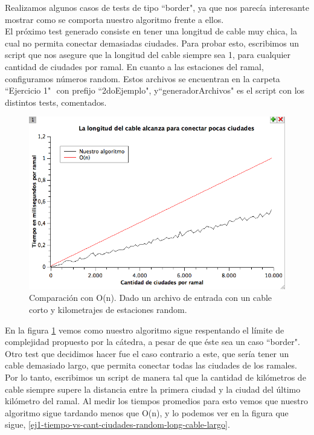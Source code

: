 Realizamos algunos casos de tests de tipo ``border", ya que nos parecía interesante mostrar como se comporta nuestro algoritmo frente a ellos.\\

El próximo test generado consiste en tener una longitud de cable muy chica, la cual no permita conectar demasiadas ciudades. Para probar esto, escribimos un script que nos asegure que la longitud del cable siempre sea 1, para cualquier cantidad de ciudades por ramal. En cuanto a las estaciones del ramal, configuramos números random. Estos archivos se encuentran en la carpeta ``Ejercicio 1" $ $ con prefijo ``2doEjemplo", y``generadorArchivos" $ $es el script con los distintos tests, comentados. \\

\begin{figure}[H]
\begin{center}

  \includegraphics[width=\linewidth]{../graficos/ej1/CableCorto.png}
  \caption{{\small Comparación con O(n). Dado un archivo de entrada con un cable corto y kilometrajes de estaciones random.}} \label{ej1-tiempo-vs-cant-ciudades-random-long-cable-1}
\endminipage

\end{center}
\end{figure}

En la figura \ref{ej1-tiempo-vs-cant-ciudades-random-long-cable-1} vemos como nuestro algoritmo sigue respentando el límite de complejidad propuesto por la cátedra, a pesar de que éste sea un caso ``border". \\

Otro test que decidimos hacer fue el caso contrario a este, que sería tener un cable demasiado largo, que permita conectar todas las ciudades de los ramales. Por lo tanto, escribimos un script de manera tal que la cantidad de kilómetros de cable siempre supere la distancia entre la primera ciudad y la ciudad del último kilómetro del ramal. Al medir los tiempos promedios para esto vemos que nuestro algoritmo sigue tardando menos que O(n), y lo podemos ver en la figura que sigue, \ref{ej1-tiempo-vs-cant-ciudades-random-long-cable-largo}. \\


